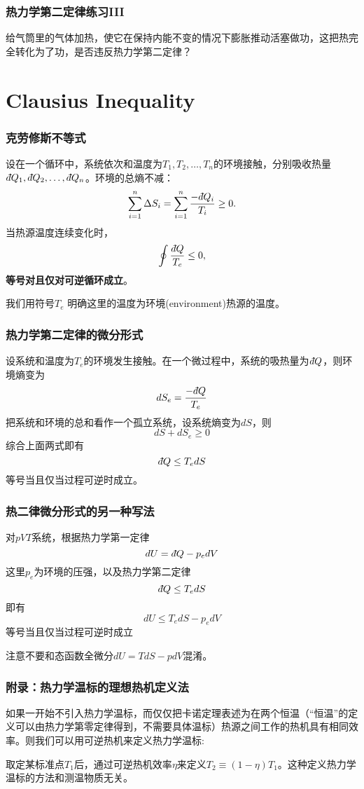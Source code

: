 \documentclass[CJK, 14pt]{beamer}
\begin{document}
\begin{frame}
\frametitle{热力学第二定律练习III}



\bitem
\item{给气筒里的气体加热，使它在保持内能不变的情况下膨胀推动活塞做功，这把热完全转化为了功，是否违反热力学第二定律？}
\eitem

\end{frame}

\section{Clausius Inequality}




\begin{frame}
\frametitle{克劳修斯不等式}

设在一个循环中，系统依次和温度为$T_1, T_2, \ldots, T_n$的环境接触，分别吸收热量$\dbar Q_1, \dbar Q_2, \ldots, \dbar Q_n$。环境的总熵不减：
$$\sum_{i=1}^n \Delta S_i = \sum_{i=1}^n \frac{-\dbar Q_i}{T_i} \ge 0.$$
当热源温度连续变化时，
{\blue $$\oint \frac{\dbar Q}{T_e} \le 0, $$}
{\bf 等号对且仅对可逆循环成立}。

{\scriptsize 我们用符号$T_e$ 明确这里的温度为环境(environment)热源的温度。}

\end{frame}


\begin{frame}
\frametitle{热力学第二定律的微分形式}

设系统和温度为$T_e$的环境发生接触。在一个微过程中，系统的吸热量为$\dbar Q$，则环境熵变为
$$ dS_e = \frac{-\dbar Q}{T_e} $$
把系统和环境的总和看作一个孤立系统，设系统熵变为$dS$，则
$$dS +dS_e \ge 0$$
综合上面两式即有
{\blue $$\dbar Q \le T_e dS $$
等号当且仅当过程可逆时成立}。

\end{frame}



\begin{frame}
\frametitle{热二律微分形式的另一种写法}

对$pVT$系统，根据热力学第一定律
  $$dU = \dbar Q - p_edV$$
这里$p_e$为环境的压强，以及热力学第二定律
$$ \dbar Q \le T_e dS $$
即有
{\blue $$dU \le T_edS - p_edV$$
等号当且仅当过程可逆时成立}

{\scriptsize 注意不要和态函数全微分$dU = TdS - pdV$混淆。}
\end{frame}


\begin{frame}
\frametitle{附录：热力学温标的理想热机定义法}

如果一开始不引入热力学温标，而仅仅把卡诺定理表述为在两个恒温（“恒温”的定义可以由热力学第零定律得到，不需要具体温标）热源之间工作的热机具有相同效率。则我们可以用可逆热机来定义热力学温标:

取定某标准点$T_1$后，通过可逆热机效率$\eta$来定义$T_2 \equiv (1-\eta)T_1$。这种定义热力学温标的方法和测温物质无关。

\end{frame}



\ech
\end{document}

